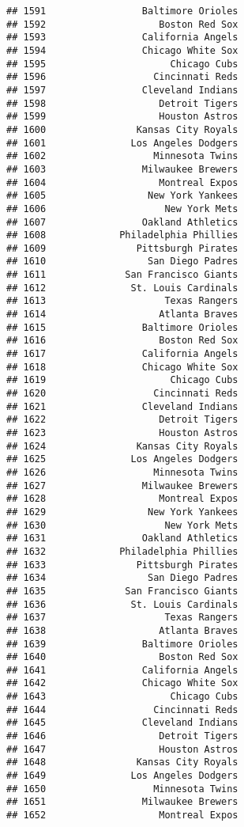\documentclass[]{article}
\begin{document}
\begin{verbatim}
## 1591                 Baltimore Orioles
## 1592                    Boston Red Sox
## 1593                 California Angels
## 1594                 Chicago White Sox
## 1595                      Chicago Cubs
## 1596                   Cincinnati Reds
## 1597                 Cleveland Indians
## 1598                    Detroit Tigers
## 1599                    Houston Astros
## 1600                Kansas City Royals
## 1601               Los Angeles Dodgers
## 1602                   Minnesota Twins
## 1603                 Milwaukee Brewers
## 1604                    Montreal Expos
## 1605                  New York Yankees
## 1606                     New York Mets
## 1607                 Oakland Athletics
## 1608             Philadelphia Phillies
## 1609                Pittsburgh Pirates
## 1610                  San Diego Padres
## 1611              San Francisco Giants
## 1612               St. Louis Cardinals
## 1613                     Texas Rangers
## 1614                    Atlanta Braves
## 1615                 Baltimore Orioles
## 1616                    Boston Red Sox
## 1617                 California Angels
## 1618                 Chicago White Sox
## 1619                      Chicago Cubs
## 1620                   Cincinnati Reds
## 1621                 Cleveland Indians
## 1622                    Detroit Tigers
## 1623                    Houston Astros
## 1624                Kansas City Royals
## 1625               Los Angeles Dodgers
## 1626                   Minnesota Twins
## 1627                 Milwaukee Brewers
## 1628                    Montreal Expos
## 1629                  New York Yankees
## 1630                     New York Mets
## 1631                 Oakland Athletics
## 1632             Philadelphia Phillies
## 1633                Pittsburgh Pirates
## 1634                  San Diego Padres
## 1635              San Francisco Giants
## 1636               St. Louis Cardinals
## 1637                     Texas Rangers
## 1638                    Atlanta Braves
## 1639                 Baltimore Orioles
## 1640                    Boston Red Sox
## 1641                 California Angels
## 1642                 Chicago White Sox
## 1643                      Chicago Cubs
## 1644                   Cincinnati Reds
## 1645                 Cleveland Indians
## 1646                    Detroit Tigers
## 1647                    Houston Astros
## 1648                Kansas City Royals
## 1649               Los Angeles Dodgers
## 1650                   Minnesota Twins
## 1651                 Milwaukee Brewers
## 1652                    Montreal Expos

\end{verbatim}
\end{document}

